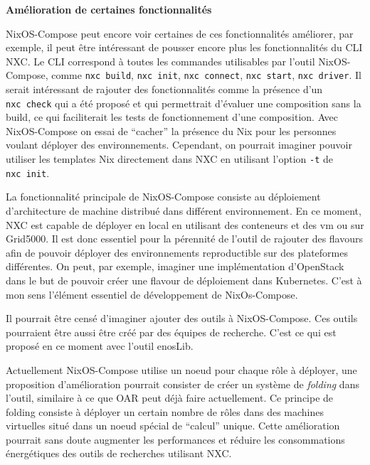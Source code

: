 \documentclass[a4paper,french,12pt, titlepage]{article}
\begin{document}
\textbf{Amélioration de certaines fonctionnalités}\newline

NixOS-Compose peut encore voir certaines de ces fonctionnalités
améliorer, par exemple, il peut être intéressant de pousser encore plus
les fonctionnalités du CLI NXC. Le CLI correspond à toutes les commandes
utilisables par l'outil NixOS-Compose, comme \texttt{nxc\ build},
\texttt{nxc\ init}, \texttt{nxc\ connect}, \texttt{nxc\ start},
\texttt{nxc\ driver}. Il serait intéressant de rajouter des
fonctionnalités comme la présence d'un \texttt{nxc\ check} qui a été
proposé et qui permettrait d'évaluer une composition sans la build, ce
qui faciliterait les tests de fonctionnement d'une composition. Avec
NixOS-Compose on essai de ``cacher'' la présence du Nix pour les
personnes voulant déployer des environnements. Cependant, on pourrait
imaginer pouvoir utiliser les templates Nix directement dans NXC en
utilisant l'option \texttt{-t} de \texttt{nxc\ init}.\newline

La fonctionnalité principale de NixOS-Compose consiste au déploiement
d'architecture de machine distribué dans différent environnement. En ce
moment, NXC est capable de déployer en local en utilisant des conteneurs
et des vm ou sur Grid5000. Il est donc essentiel pour la pérennité de
l'outil de rajouter des flavours afin de pouvoir déployer des
environnements reproductible sur des plateformes différentes. On peut,
par exemple, imaginer une implémentation d'OpenStack dans le but de
pouvoir créer une flavour de déploiement dans Kubernetes. C'est à mon
sens l'élément essentiel de développement de NixOs-Compose.\newline

Il pourrait être censé d'imaginer ajouter des outils à NixOS-Compose.
Ces outils pourraient être aussi être créé par des équipes de recherche.
C'est ce qui est proposé en ce moment avec l'outil enosLib.\newline

Actuellement NixOS-Compose utilise un noeud pour chaque rôle à déployer,
une proposition d'amélioration pourrait consister de créer un système de
\emph{folding} dans l'outil, similaire à ce que OAR peut déjà faire
actuellement. Ce principe de folding consiste à déployer un certain
nombre de rôles dans des machines virtuelles situé dans un noeud spécial
de ``calcul'' unique. Cette amélioration pourrait sans doute augmenter
les performances et réduire les consommations énergétiques des outils de
recherches utilisant NXC.\newline
\end{document}
